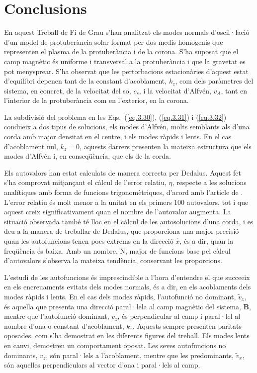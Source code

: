 
\chapter{Conclusions}

En aquest Treball de Fi de Grau s'han analitzat els modes normals d'oscil·lació d'un model de protuberància solar format per dos medis homogenis que representen el plasma de la protuberància i de la corona.
S'ha suposat que el camp magnètic és uniforme i transversal a la protuberància i que la gravetat es pot menysprear.
S'ha observat que les pertorbacions estacionàries d'aquest estat d'equilibri depenen tant de la constant d'acoblament, $k_z$,
com dels paràmetres del sistema, en concret, de la velocitat del so, $c_s$, i la velocitat d'Alfvén, $v_A$,
tant en l'interior de la protuberància com en l'exterior, en la corona.

La subdivisió del problema en les Eqs.~(\ref{eq.3.30}), (\ref{eq.3.31}) i (\ref{eq.3.32}) condueix a dos tipus de solucions,
els modes d'Alfvén, molts semblants als d'una corda amb major densitat en el centre, i els modes ràpids i lents.
En el cas d'acoblament nul, $k_z = 0$, aquests darrers presenten la mateixa estructura que els modes d'Alfvén i, en conseqüència, que els de la corda.

Els autovalors han estat calculats de manera correcta per Dedalus.
Aquest fet s'ha comprovat mitjançant el càlcul de l'error relatiu, $\eta$, respecte a les solucions analítiques amb forma de funcions trigonomètriques,
d'acord amb l'article de \textcite{oscillation_modes_II}.
L'error relatiu és molt menor a la unitat en els primers 100 autovalors, tot i que aquest creix significativament quan el nombre de l'autovalor augmenta. 
La situació observada també té lloc en el càlcul de les autosolucions d'una corda, i es deu a la manera de treballar de Dedalus,
que proporciona una major precisió quan les autofuncions tenen pocs extrems en la direcció $\hat{x}$, és a dir, quan la freqüència és baixa.
Amb un nombre, N, major de funcions base pel càlcul d'autovalors s'observa la mateixa tendència, conservant les proporcions.

L'estudi de les autofuncions és imprescindible a l'hora d'entendre el que succeeix en els encreuaments evitats dels modes normals,
és a dir, en els acoblaments dels modes ràpids i lents.
En el cas dels modes ràpids, l'autofunció no dominant, $\tilde{v}_{x}$, és aquella que presenta una direcció paral·lela al camp magnètic del sistema, $\bm{B}$,
mentre que l'autofunció dominant, $v_z$, és perpendicular al camp i paral·lel al nombre d'ona o constant d'acoblament, $k_z$.
Aquests sempre presenten paritats oposades, com s'ha demostrat en les diferents figures del treball.
Els modes lents en canvi, demostren un comportament oposat. Les seves autofuncions no dominants, $v_z$, són paral·lels a l'acoblament,
mentre que les predominants, $\tilde{v}_{x}$, són aquelles perpendiculars al vector d'ona i paral·lels al camp.

